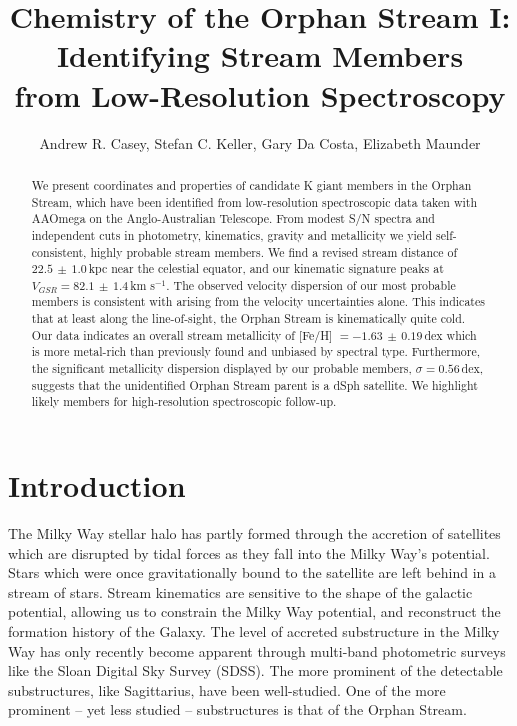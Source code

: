 \documentclass[10pt,apjl]{emulateapj}
\begin{document}


\title{Chemistry of the Orphan Stream I: Identifying Stream Members \\ from Low-Resolution Spectroscopy}

\author{Andrew R. Casey, Stefan C. Keller, Gary Da Costa, Elizabeth Maunder}

\begin{abstract}
We present coordinates and properties of candidate K giant members in the Orphan Stream, which have been identified from low-resolution spectroscopic data taken with AAOmega on the Anglo-Australian Telescope. From modest S/N spectra and independent cuts in photometry, kinematics, gravity and metallicity we yield self-consistent, highly probable stream members. We find a revised stream distance of $22.5\,\pm\,1.0$\,kpc near the celestial equator, and our kinematic signature peaks at $V_{GSR} = 82.1\,\pm\,1.4$\,km s$^{-1}$. The observed velocity dispersion of our most probable members is consistent with arising from the velocity uncertainties alone. This indicates that at least along the line-of-sight, the Orphan Stream is kinematically quite cold. Our data indicates an overall stream metallicity of [Fe/H] $= -1.63\,\pm\,0.19$\,dex which is more metal-rich than previously found and unbiased by spectral type. Furthermore, the significant metallicity dispersion displayed by our probable members, $\sigma = 0.56$\,dex, suggests that the unidentified Orphan Stream parent is a dSph satellite. We highlight likely members for high-resolution spectroscopic follow-up.
\end{abstract}


\section{Introduction}
\label{sec:introduction}

The Milky Way stellar halo has partly formed through the accretion of satellites which are disrupted by tidal forces as they fall into the Milky Way's potential. Stars which were once gravitationally bound to the satellite are left behind in a stream of stars. Stream kinematics are sensitive to the shape of the galactic potential, allowing us to constrain the Milky Way potential, and reconstruct the formation history of the Galaxy. The level of accreted substructure in the Milky Way has only recently become apparent through multi-band photometric surveys like the Sloan Digital Sky Survey (SDSS). The more prominent of the detectable substructures, like Sagittarius, have been well-studied. One of the more prominent \--- yet less studied \--- substructures is that of the Orphan Stream. 
\end{document}
